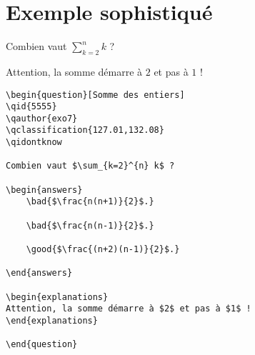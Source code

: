 \documentclass[12pt,a4paper]{article}
\begin{document}
\section{Exemple sophistiqué}

\begin{center}
\begin{minipage}{0.8\textwidth}
\begin{question}
\qidontknow

Combien vaut $\sum_{k=2}^{n} k$ ?

\begin{answers}
    
    
\end{answers}

\begin{explanations}
Attention, la somme démarre à $2$ et pas à $1$ !
\end{explanations}

\end{question}
\end{minipage}
\end{center}

\begin{center}
\begin{minipage}{0.8\textwidth}
\begin{verbatim}
\begin{question}[Somme des entiers]
\qid{5555}
\qauthor{exo7}
\qclassification{127.01,132.08}
\qidontknow

Combien vaut $\sum_{k=2}^{n} k$ ?

\begin{answers}
    \bad{$\frac{n(n+1)}{2}$.}
    
    \bad{$\frac{n(n-1)}{2}$.} 
    
    \good{$\frac{(n+2)(n-1)}{2}$.}        

\end{answers}

\begin{explanations}
Attention, la somme démarre à $2$ et pas à $1$ !
\end{explanations}

\end{question}
\end{verbatim}
\end{minipage}
\end{center}
\end{document}
